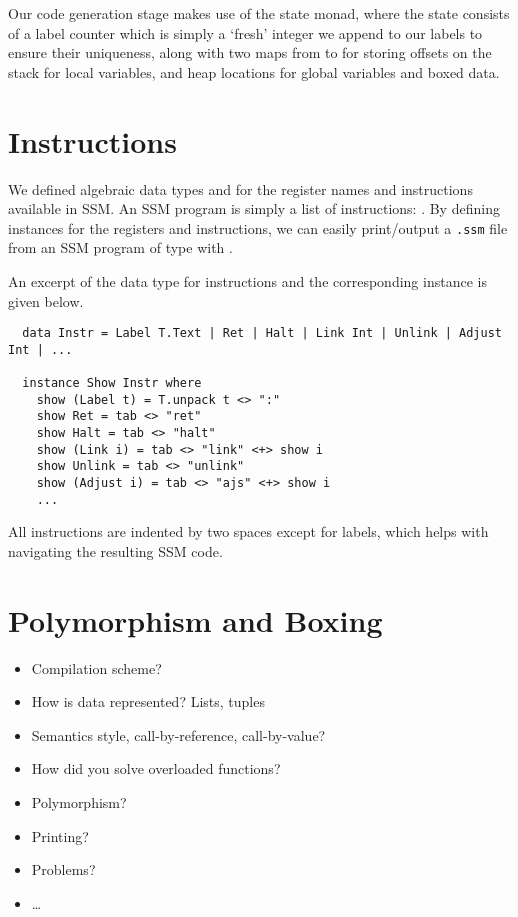 Our code generation stage makes use of the state monad, where the state consists
of a label counter which is simply a `fresh' integer we append to our labels to
ensure their uniqueness, along with two maps from  to
 for storing offsets on the stack for local variables, and heap
locations for global variables and boxed data.


\section{Instructions}

We defined algebraic data types  and  for the
register names and instructions available in SSM. An SSM program is simply a
list of instructions: .
By defining  instances for the registers and instructions, we can
easily print/output a \verb|.ssm| file from an SSM program  of type
\haskell{[Instr]} with .

An excerpt of the data type for instructions and the corresponding 
instance is given below.

\begin{verbatim}
  data Instr = Label T.Text | Ret | Halt | Link Int | Unlink | Adjust Int | ...

  instance Show Instr where
    show (Label t) = T.unpack t <> ":"
    show Ret = tab <> "ret"
    show Halt = tab <> "halt"
    show (Link i) = tab <> "link" <+> show i
    show Unlink = tab <> "unlink"
    show (Adjust i) = tab <> "ajs" <+> show i
    ...
\end{verbatim}

All instructions are indented by two spaces except for labels, which helps with
navigating the resulting SSM code.



\section{Polymorphism and Boxing}






\begin{itemize}
	\item Compilation scheme?
	\item How is data represented? Lists, tuples
	\item Semantics style, call-by-reference, call-by-value?
	\item How did you solve overloaded functions?
	\item Polymorphism?
	\item Printing?
	\item Problems?
	\item\ldots
\end{itemize}
